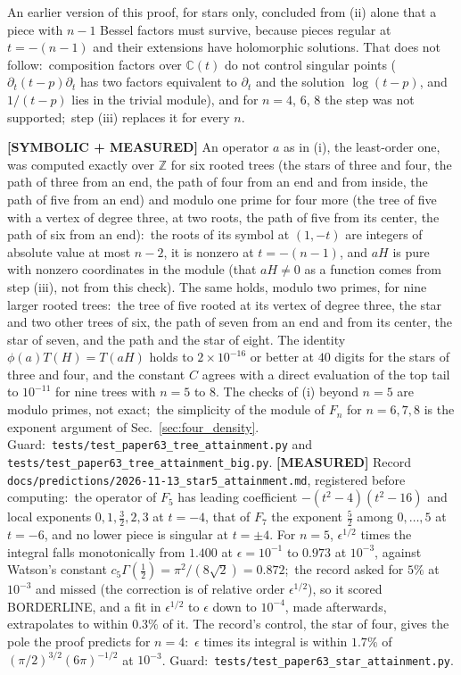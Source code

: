 \documentclass[aps,pra,twocolumn,superscriptaddress,longbibliography]{revtex4-2}
\begin{document}
An earlier version of this proof, for stars only, concluded from (ii) alone
that a piece with $n-1$ Bessel factors must survive, because pieces regular
at $t=-(n-1)$ and their extensions have holomorphic solutions.  That does not
follow:\ composition factors over $\mathbb{C}(t)$ do not control singular
points ($\partial_t(t-p)\partial_t$ has two factors equivalent to $\partial_t$
and the solution $\log(t-p)$, and $1/(t-p)$ lies in the trivial module), and
for $n=4$, $6$, $8$ the step was not supported;\ step (iii) replaces it for every $n$.

\textbf{[SYMBOLIC + MEASURED]} An operator $a$ as in (i), the least-order one, was computed exactly
over $\mathbb{Z}$ for six rooted trees (the stars of three and four, the path of
three from an end, the path of four from an end and from inside, the path of
five from an end) and modulo one prime for four more (the tree of five with a
vertex of degree three, at two roots, the path of five from its center, the path of
six from an end):\ the roots of its symbol at $(1,-t)$ are integers of absolute
value at most $n-2$, it is nonzero at $t=-(n-1)$, and $aH$ is pure with nonzero coordinates
in the module (that $aH\neq0$ as a function comes from step (iii), not from this check).  The
same holds, modulo two primes, for nine larger rooted trees:\ the tree of five rooted at its vertex of degree three, the star
and two other trees of six, the path of seven from an end and from its center, the star of
seven, and the path and the star of eight.  The identity
$\phi(a)T(H)=T(aH)$ holds to $2\times10^{-16}$ or better at $40$ digits for the
stars of three and four, and the constant $C$ agrees with a direct evaluation
of the top tail to $10^{-11}$ for nine trees with $n=5$ to $8$.  The checks of (i) beyond
$n=5$ are modulo primes, not exact;\ the simplicity of the module of $F_n$ for
$n=6,7,8$ is the exponent argument of Sec.~\ref{sec:four_density}.  Guard:\
\texttt{tests/test\_paper63\_tree\_attainment.py} and
\texttt{tests/test\_paper63\_tree\_attainment\_big.py}.
\textbf{[MEASURED]} Record
\texttt{docs/predictions/2026-11-13\_star5\_attainment.md}, registered before
computing:\ the operator of $F_5$ has leading coefficient
$-(t^2-4)(t^2-16)$ and local exponents $0,1,\tfrac32,2,3$ at $t=-4$, that of
$F_7$ the exponent $\tfrac52$ among $0,\dots,5$ at $t=-6$, and no lower piece is
singular at $t=\pm4$.  For $n=5$, $\epsilon^{1/2}$ times the integral falls
monotonically from $1.400$ at $\epsilon=10^{-1}$ to $0.973$ at $10^{-3}$,
against Watson's constant $c_5\Gamma(\tfrac12)=\pi^2/(8\sqrt2)=0.872$;\ the
record asked for $5\%$ at $10^{-3}$ and missed (the correction is of relative
order $\epsilon^{1/2}$), so it scored BORDERLINE, and a fit in $\epsilon^{1/2}$ to
$\epsilon$ down to $10^{-4}$, made afterwards, extrapolates to within $0.3\%$ of
it.  The record's control, the star of four, gives the pole the proof
predicts for $n=4$:\ $\epsilon$ times its
integral is within $1.7\%$ of $(\pi/2)^{3/2}(6\pi)^{-1/2}$ at $10^{-3}$.  Guard:\
\texttt{tests/test\_paper63\_star\_attainment.py}.
\end{document}
